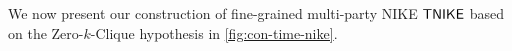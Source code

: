  We now present our construction of fine-grained multi-party NIKE $\mathsf{TNIKE}$ based on the Zero-$k$-Clique hypothesis in \cref{fig:con-time-nike}. %
%        
